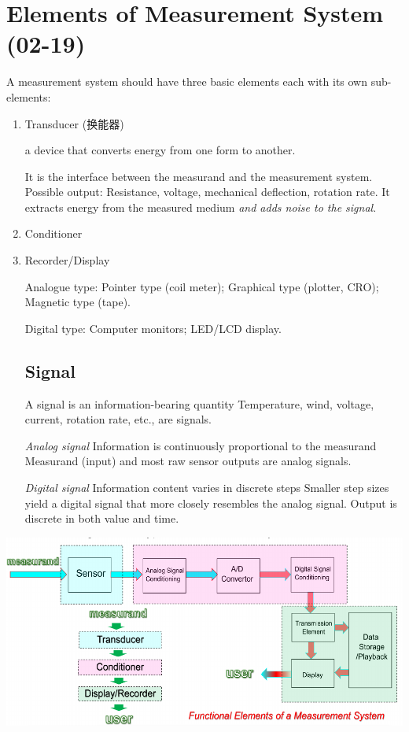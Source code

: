 \documentclass[a4paper,UTF8]{article}
\theoremstyle{mystyle}{
  \newtheorem{law}{Law}
}
\begin{document}
\section{Elements of Measurement System (02-19)}
A measurement system should have three basic elements each with its own sub-elements:
\begin{enumerate}
\item Transducer (换能器) 

a device that converts energy from one form to another.

\begin{example}[Sensor]
It is the interface between the measurand and 
the measurement system. 
Possible output: Resistance, voltage, 
mechanical deflection, rotation rate. 
It extracts energy from the measured medium 
\emph{ and adds noise to
the signal}.
\end{example}

\item Conditioner
\item Recorder/Display

Analogue type: Pointer type (coil meter);
 Graphical type (plotter, CRO);
 Magnetic type (tape).

 Digital type:
 Computer monitors;
 LED/LCD display.

\subsection{Signal}
A signal is an information-bearing quantity
 Temperature, wind, voltage, current, rotation rate, etc.,
are signals.

 \emph{Analog signal}
 Information is continuously proportional to the measurand
 Measurand (input) and most raw sensor outputs are analog signals.

 \emph{Digital signal}
 Information content varies in discrete steps
 Smaller step sizes yield a digital signal that more closely resembles
the analog signal.
 Output is discrete in both value and time.
\end{enumerate}
\includegraphics[width=\textwidth]{fig/elements.pdf}
\end{document}
